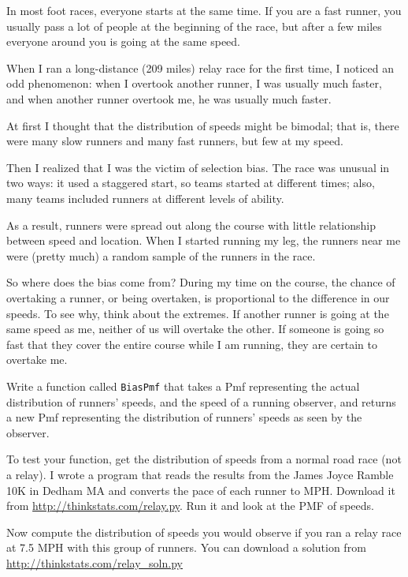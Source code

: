 \documentclass[12pt]{book}
\begin{document}
\begin{exercise}
\label{relay}

In most foot races, everyone starts at the same time.  If you are a
fast runner, you usually pass a lot of people at the beginning of the
race, but after a few miles everyone around you is going at the same
speed.

When I ran a long-distance (209 miles) relay race for the first
time, I noticed an odd phenomenon: when I overtook another runner, I
was usually much faster, and when another runner overtook me, he was
usually much faster.

At first I thought that the distribution of speeds might be bimodal;
that is, there were many slow runners and many fast runners, but few
at my speed.

Then I realized that I was the victim of selection bias.  The race
was unusual in two ways: it used a staggered start, so teams started
at different times; also, many teams included runners at different
levels of ability.

As a result, runners were spread out along the course with little
relationship between speed and location.  When I started running my
leg, the runners near me were (pretty much) a random sample of the
runners in the race.

So where does the bias come from?  During my time on the course, the
chance of overtaking a runner, or being overtaken, is proportional to
the difference in our speeds.  To see why, think about the extremes.
If another runner is going at the same speed as me, neither of us will
overtake the other.  If someone is going so fast that they cover the
entire course while I am running, they are certain to overtake me.

Write a function called {\tt BiasPmf} that takes a Pmf representing
the actual distribution of runners' speeds, and the speed of a running
observer, and returns a new Pmf representing the distribution of
runners' speeds as seen by the observer.

To test your function, get the distribution of speeds from a
normal road race (not a relay).  I wrote a program that reads the
results from the James Joyce Ramble 10K in Dedham MA and converts the
pace of each runner to MPH.  Download it from
\url{http://thinkstats.com/relay.py}.  Run it and look at the PMF of
speeds.

Now compute the distribution of speeds you would observe if you ran a
relay race at 7.5 MPH with this group of runners.  You can download a
solution from \url{http://thinkstats.com/relay_soln.py}

\end{exercise}
\end{document}
